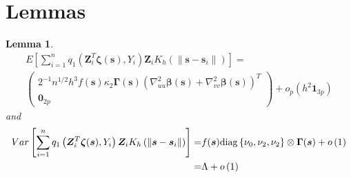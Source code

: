 \documentclass[authoryear,review, 12pt]{elsarticle}
\newtheorem{lem}{Lemma}
\begin{document}
\section{Lemmas}
\begin{lem}
\label{lemma:omega}
\begin{multline*}
E\left[\sum_{i=1}^{n}q_{1}\left(\bm{Z}_{i}^{T}\bm{\zeta}(\bm{s}),Y_{i}\right)\bm{Z}_{i}K_{h}\left(\|\bm{s}-\bm{s}_{i}\|\right)\right]=\\
\left(\begin{array}{c}
2^{-1}n^{1/2}h^{3}f(\bm{s})\kappa_{2}\bm{\Gamma}(\bm{s})\left(\nabla_{uu}^{2}\bm{\beta}(\bm{s})+\nabla_{vv}^{2}\bm{\beta}(\bm{s})\right)^{T}\\
\bm{0}_{2p}
\end{array}\right)+o_{p}\left(h^{2}\bm{1}_{3p}\right)
\end{multline*}
and
\begin{align*}
Var\left[\sum_{i=1}^{n}q_{1}\left(\bm{Z}_{i}^{T}\bm{\zeta}(\bm{s}),Y_{i}\right)\bm{Z}_{i}K_{h}\left(\|\bm{s}-\bm{s}_{i}\|\right)\right]= & f(\bm{s}){\rm diag}\left\{ \nu_{0},\nu_{2},\nu_{2}\right\} \otimes\bm{\Gamma}(\bm{s})+o\left(1\right)\\
= & \Lambda+o\left(1\right)
\end{align*}
\end{lem}
\end{document}
